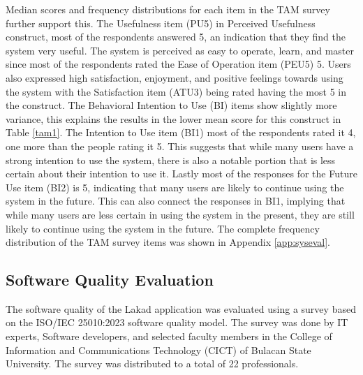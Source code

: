 Median scores and frequency distributions for each item in the TAM survey further support this. The Usefulness item (PU5) in Perceived Usefulness construct, most of the respondents answered 5, an indication that they find the system very useful. The system is perceived as easy to operate, learn, and master since most of the respondents rated the Ease of Operation item (PEU5) 5. Users also expressed high satisfaction, enjoyment, and positive feelings towards using the system with the Satisfaction item (ATU3) being rated having the most 5 in the construct. The Behavioral Intention to Use (BI) items show slightly more variance, this explains the results in the lower mean score for this construct in Table \ref{tam1}. The Intention to Use item (BI1) most of the respondents rated it 4, one more than the people rating it 5. This suggests that while many users have a strong intention to use the system, there is also a notable portion that is less certain about their intention to use it. Lastly most of the responses for the Future Use item (BI2) is 5, indicating that many users are likely to continue using the system in the future. This can also connect the responses in BI1, implying that while many users are less certain in using the system in the present, they are still likely to continue using the system in the future. The complete frequency distribution of the TAM survey items was shown in Appendix \ref{app:syseval}.

\subsection{Software Quality Evaluation}

The software quality of the Lakad application was evaluated using a survey based on the ISO/IEC 25010:2023 software quality model. The survey was done by IT experts, Software developers, and selected faculty members in the College of Information and Communications Technology (CICT) of Bulacan State University. The survey was distributed to a total of 22 professionals.

